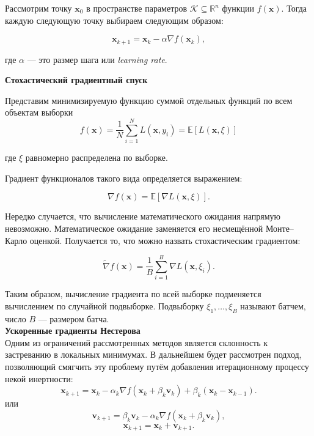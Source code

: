 \documentclass[a4paper]{article}
\begin{document}
Рассмотрим точку $\mathbf{x}_0$ в пространстве параметров $\mathcal{K} \subseteq \mathbb{R}^n$ функции $f(\mathbf{x})$.  
Тогда каждую следующую точку выбираем следующим образом:

\begin{equation}
    \mathbf{x}_{k+1} = \mathbf{x}_k - \alpha \nabla f(\mathbf{x}_k),
\end{equation}

где $\alpha$ — это размер шага или \textit{learning rate}.

\textbf{Стохастический градиентный спуск}

Представим минимизируемую функцию суммой отдельных функций по всем объектам выборки 
\[
f(\mathbf{x}) = \frac{1}{N}\sum_{i=1}^{N} L(\mathbf{x}, y_i) = \mathbb{E}[L(\mathbf{x}, \xi)]
\]
 
где $\xi$ равномерно распределена по выборке.  

Градиент функционалов такого вида определяется выражением:

\[
\nabla f(\mathbf{x}) = \mathbb{E}[\nabla L(\mathbf{x}, \xi)].
\]

Нередко случается, что вычисление математического ожидания напрямую невозможно.  
Математическое ожидание заменяется его несмещённой Монте–Карло оценкой.  
Получается то, что можно назвать стохастическим градиентом:

\[
\widetilde{\nabla} f(\mathbf{x}) = \frac{1}{B} \sum_{i=1}^{B} \nabla L(\mathbf{x}, \xi_i).
\]

Таким образом, вычисление градиента по всей выборке подменяется вычислением по случайной подвыборке.  
Подвыборку $\xi_1, \ldots, \xi_B$ называют батчем, число $B$ — размером батча.\\

\textbf{Ускоренные градиенты Нестерова}\\
Одним из ограничений рассмотренных методов является склонность к застреванию в локальных минимумах.
В дальнейшем будет рассмотрен подход, позволяющий смягчить эту проблему путём добавления итерационному процессу некой инертности:\\ \begin{equation}
    \mathbf{x}_{k+1} = \mathbf{x}_k - \alpha_k \nabla f(\mathbf{x}_k + \mathit{\beta}_k \mathbf{v}_k) + \mathit{\beta}_k (\mathbf{x}_k - \mathbf{x}_{k-1}).
\end{equation}
или \begin{equation}
\mathbf{v}_{k+1} = \mathit{\beta}_k \mathbf{v}_k - \alpha_k \nabla f(\mathbf{x}_k + \mathit{\beta}_k \mathbf{v}_k), 
\end{equation}
\begin{equation}
\mathbf{x}_{k+1} = \mathbf{x}_k + \mathbf{v}_{k+1}.
\end{equation}
\end{document}
